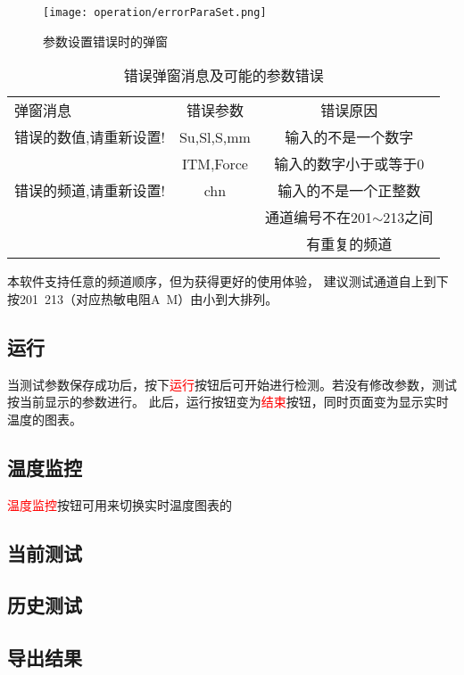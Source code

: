 \begin{figure}[htbp]
    \centering
    \texttt{[image: operation/errorParaSet.png]}
    \caption{ 参数设置错误时的弹窗 \label{fig:errorParaSet}}
\end{figure}
\begin{table}[htbp]
    \centering
    \caption{ 错误弹窗消息及可能的参数错误 \label{tab:errorInfoNormalUser}}
    \begin{tabular}{@{}lcc@{}}
        弹窗消息               & 错误参数   & 错误原因                     \\
        错误的数值,请重新设置! & Su,Sl,S,mm & 输入的不是一个数字           \\
                               & ITM,Force  & 输入的数字小于或等于0        \\
        错误的频道,请重新设置! & chn        & 输入的不是一个正整数         \\
                               &            & 通道编号不在201$\sim$213之间 \\
                               &            & 有重复的频道
    \end{tabular}
\end{table}
\begin{note}
    本软件支持任意的频道顺序，但为获得更好的使用体验，
    建议测试通道自上到下按201~213（对应热敏电阻A~M）由小到大排列。
\end{note}
\subsection{运行}
当测试参数保存成功后，按下\textcolor{red}{运行}按钮后可开始进行检测。若没有修改参数，测试按当前显示的参数进行。
此后，运行按钮变为\textcolor{red}{结束}按钮，同时页面变为显示实时温度的图表。
\subsection{温度监控}
\textcolor{red}{温度监控}按钮可用来切换实时温度图表的

\subsection{当前测试}
\subsection{历史测试}
\subsection{导出结果}
